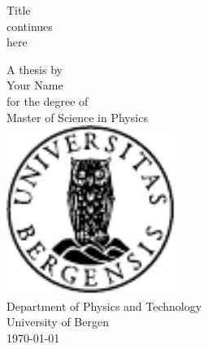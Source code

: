 \documentclass[12pt, a4paper]{report}
\begin{document}
	\pagestyle{empty}
	\begin{center}
    
	{\LARGE Title\\ continues \\here\par}  \vspace*{3em}
	{\large A thesis by \\ \vspace*{1.0em} \Large Your Name}\\  \vspace*{1.0em} \large for the degree of \\  \vspace*{1.0em}
	{\Large Master of Science in Physics }\\ \vspace*{3.5em}
	{\includegraphics[width=5.5cm]{../figs/UiB_logo.pdf}} \\ \vspace*{3.5em}
	{\Large Department of Physics and Technology\\ \vspace*{1.0em}
		University of Bergen }\\ \vspace*{1.0em}
	{\large \printdayoff\today }
	\end{center}
\end{document}
